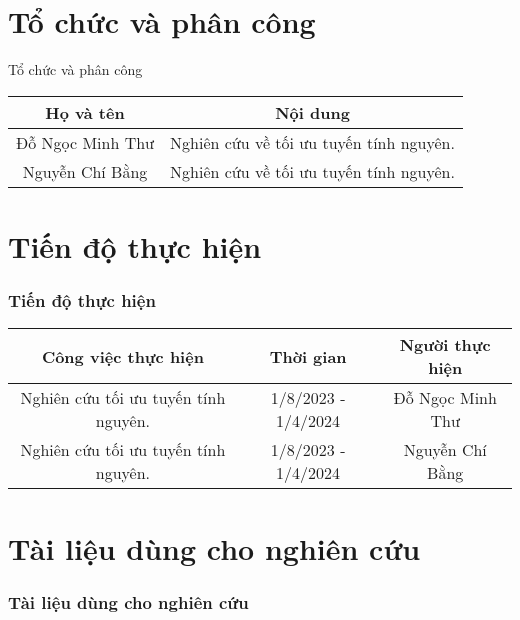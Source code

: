 \documentclass{beamer}
\begin{document}
\section{Tổ chức và phân công}
\begin{frame}{Tổ chức và phân công}
    \begin{table}
        \begin{tabular}{|c|c|}
            \hline
            Họ và tên & Nội dung \\
            \hline \hline
            Đỗ Ngọc Minh Thư & Nghiên cứu về tối ưu tuyến tính nguyên. \\
            Nguyễn Chí Bằng & Nghiên cứu về tối ưu tuyến tính nguyên. \\
            \hline
        \end{tabular}
    \end{table}
\end{frame}
\section{Tiến độ thực hiện}
\begin{frame}[shrink=25]
    \frametitle{Tiến độ thực hiện}
    \vspace{2cm}
    \begin{table}
        \begin{tabular}{|c|c|c|}
            \hline
            Công việc thực hiện & Thời gian & Người thực hiện \\
            \hline \hline
            Nghiên cứu tối ưu tuyến tính nguyên. & 1/8/2023 - 1/4/2024 & Đỗ Ngọc Minh Thư \\
            Nghiên cứu tối ưu tuyến tính nguyên. & 1/8/2023 - 1/4/2024 & Nguyễn Chí Bằng \\
            \hline
        \end{tabular}
    \end{table}
\end{frame}
\section{Tài liệu dùng cho nghiên cứu}
\begin{frame}[allowframebreaks]
    \frametitle{Tài liệu dùng cho nghiên cứu}
    
    
\end{frame}
\end{document}
